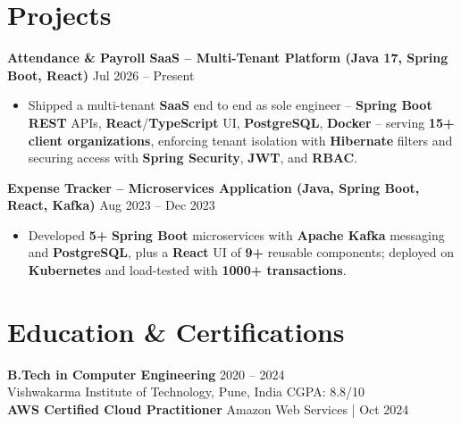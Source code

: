 \documentclass[a4paper,10pt]{article}
\begin{document}
\section*{Projects}

\textbf{Attendance \& Payroll SaaS -- Multi-Tenant Platform (Java 17, Spring Boot, React)} \hfill Jul 2026 -- Present
\begin{itemize}[leftmargin=*]
    \item Shipped a multi-tenant \textbf{SaaS} end to end as sole engineer -- \textbf{Spring Boot} \textbf{REST} APIs, \textbf{React}/\textbf{TypeScript} UI, \textbf{PostgreSQL}, \textbf{Docker} -- serving \textbf{15+ client organizations}, enforcing tenant isolation with \textbf{Hibernate} filters and securing access with \textbf{Spring Security}, \textbf{JWT}, and \textbf{RBAC}.
\end{itemize}

\textbf{Expense Tracker -- Microservices Application (Java, Spring Boot, React, Kafka)} \hfill Aug 2023 -- Dec 2023
\begin{itemize}[leftmargin=*]
    \item Developed \textbf{5+} \textbf{Spring Boot} microservices with \textbf{Apache Kafka} messaging and \textbf{PostgreSQL}, plus a \textbf{React} UI of \textbf{9+} reusable components; deployed on \textbf{Kubernetes} and load-tested with \textbf{1000+ transactions}.
\end{itemize}

\section*{Education \& Certifications}
\textbf{B.Tech in Computer Engineering} \hfill 2020 -- 2024 \\
Vishwakarma Institute of Technology, Pune, India \hfill CGPA: 8.8/10 \\
\textbf{AWS Certified Cloud Practitioner} \hfill Amazon Web Services \;|\; Oct 2024
\end{document}

